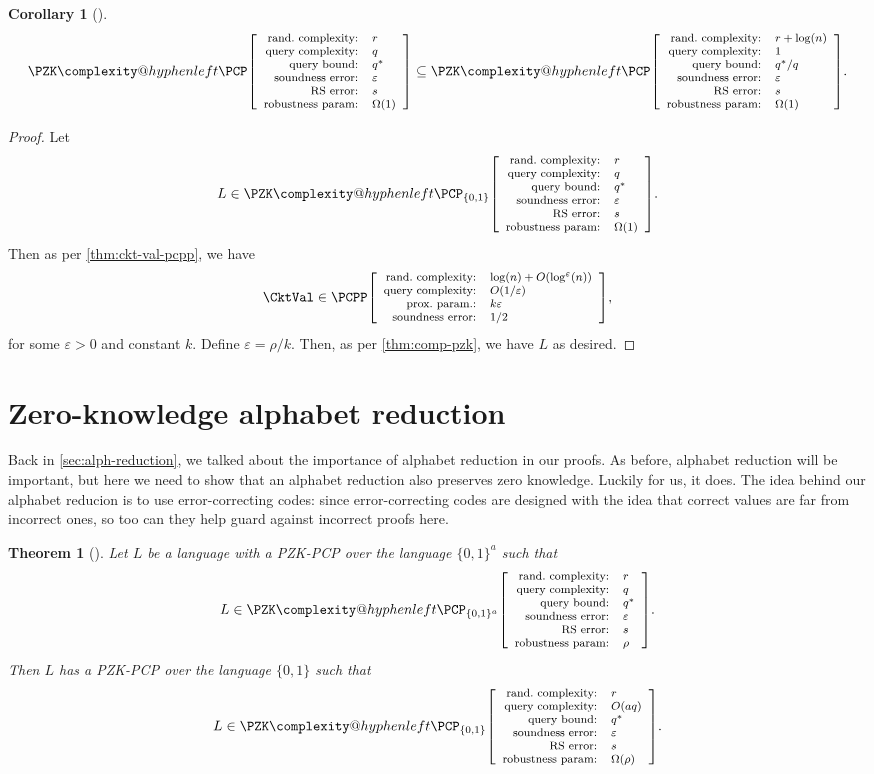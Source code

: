 \documentclass[english,12pt]{reedthesis}
\makeatletter
\theoremstyle{plain}
\newtheorem{thm}{Theorem}[section]
\newtheorem{cor}[cor]{Corollary}
\theoremstyle{definition}
\theoremstyle{remark}
\newcommand{\pcpp}[4]{%
  \ensuremath%
  \mleft[{\footnotesize\begin{array}{r l}
    \text{rand.\ complexity:} & #1 \\
    \text{query complexity:} & #2 \\
    \text{prox.\ param.:} & #3 \\
    \text{soundness error:} & #4
  \end{array}}\mright]%
}
\newcommand{\pzkpcpr}[6]{%
  \ensuremath%
  \mleft[{\footnotesize\begin{array}{r l}
    \text{rand.\ complexity:} & #1 \\
    \text{query complexity:} & #2 \\
    \text{query bound:} & #3 \\
    \text{soundness error:} & #4 \\
    \text{RS error:} & #5 \\
    \text{robustness param:} & #6
  \end{array}}\mright]%
}
\newcommand{\PZKPCP}{%
  \PZK\complexity@hyphenleft\PCP
}
\makeatother
\begin{document}
\begin{cor}[{\cite[Corollary 3.11]{GOS25}}]\label{cor:constant-query}
  \begin{equation}\label{eqn:constant-query}
    \PZKPCP\pzkpcpr{r}{q}{q^{*}}{\varepsilon}{s}{\Omega(1)} \subseteq
    \PZKPCP\pzkpcpr{r + \log(n)}{1}{q^{*}/q}{\varepsilon}{s}{\Omega(1)}.
  \end{equation}
\end{cor}

\begin{proof}
  Let
  \begin{equation}
    L \in \PZKPCP_{\{0, 1\}}\pzkpcpr{r}{q}{q^{*}}{\varepsilon}{s}{\Omega(1)}.
  \end{equation}
  Then as per \cref{thm:ckt-val-pcpp}, we have
  \begin{equation}
    \CktVal \in \PCPP\pcpp{\log(n) + O(\log^{\varepsilon}(n))}{O(1/\varepsilon)}{k\varepsilon}{1/2},
  \end{equation}
  for some $\varepsilon > 0$ and constant $k$. Define $\varepsilon = \rho/k$. Then, as per
  \cref{thm:comp-pzk}, we have $L$ as desired.
\end{proof}

\section{Zero-knowledge alphabet reduction}\label{sec:zk-alph-red}

Back in \cref{sec:alph-reduction}, we talked about the importance of alphabet
reduction in our proofs. As before, alphabet reduction will be important, but
here we need to show that an alphabet reduction also preserves zero knowledge.
Luckily for us, it does. The idea behind our alphabet reducion is to use
error-correcting codes: since error-correcting codes are designed with the idea
that correct values are far from incorrect ones, so too can they help guard
against incorrect proofs here.

\begin{thm}[{\cite[Lemma 2.13]{BGHSV06}}]%
  \label{thm:zk-alph-red}\label{alphabet reduction!zero-knowledge}
  Let $L$ be a language with a PZK-PCP over the language $\{0, 1\}^{a}$ such
  that
  \[
    L \in \PZKPCP_{\{0,1\}^{a}}\pzkpcpr{r}{q}{q^{*}}{\varepsilon}{s}{\rho}.
  \]
  Then $L$ has a PZK-PCP over the language $\{0, 1\}$ such that
  \[
    L \in \PZKPCP_{\{0,1\}}\pzkpcpr{r}{O(aq)}{q^{*}}{\varepsilon}{s}{\Omega(\rho)}.
  \]
\end{thm}
\end{document}

